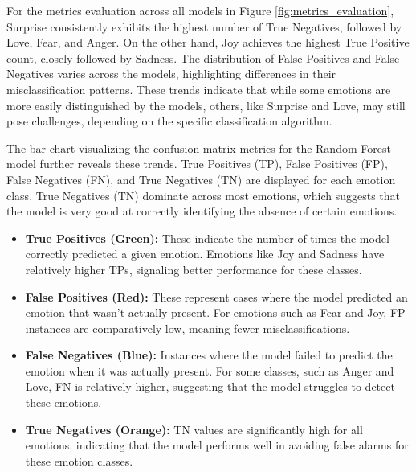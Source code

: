 For the metrics evaluation across all models in Figure \ref{fig:metrics_evaluation}, Surprise consistently exhibits the highest number of True Negatives, followed by Love, Fear, and Anger. On the other hand, Joy achieves the highest True Positive count, closely followed by Sadness. The distribution of False Positives and False Negatives varies across the models, highlighting differences in their misclassification patterns. These trends indicate that while some emotions are more easily distinguished by the models, others, like Surprise and Love, may still pose challenges, depending on the specific classification algorithm.

The bar chart visualizing the confusion matrix metrics for the Random Forest model further reveals these trends. True Positives (TP), False Positives (FP), False Negatives (FN), and True Negatives (TN) are displayed for each emotion class. True Negatives (TN) dominate across most emotions, which suggests that the model is very good at correctly identifying the absence of certain emotions. 

\begin{itemize}
    \item \textbf{True Positives (Green):} These indicate the number of times the model correctly predicted a given emotion. Emotions like Joy and Sadness have relatively higher TPs, signaling better performance for these classes.
    \item \textbf{False Positives (Red):} These represent cases where the model predicted an emotion that wasn’t actually present. For emotions such as Fear and Joy, FP instances are comparatively low, meaning fewer misclassifications.
    \item \textbf{False Negatives (Blue):} Instances where the model failed to predict the emotion when it was actually present. For some classes, such as Anger and Love, FN is relatively higher, suggesting that the model struggles to detect these emotions.
    \item \textbf{True Negatives (Orange):} TN values are significantly high for all emotions, indicating that the model performs well in avoiding false alarms for these emotion classes.
\end{itemize}

\clearpage


